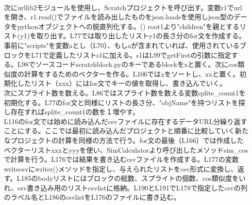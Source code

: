 \documentclass[a4paper,10pt,onecolumn,oneside,openany]{jsbook}
\begin{document}
\\
次にurllib2モジュールを使用し、Scratchプロジェクトを呼び出す。変数r1でurlを開き、r1.read()でファイルを読み出したものをjson.loadsを使用しjson型のデータをpythonオブジェクトへの脱直列化する。(\cite{loads})  root1より"children"を親とするリスト(y1)を取り出す。L77では取り出したリストy1の長さ分のfor文を作成する。事前に"scripts"を変数aとし（L70）、もしaが含まれていれば、使用されているブロックをL71で定義したリストs1に加える。s1はL99でgetFirstの引数に指定する。L98でソースコードscratchblock.pyのキーであるblockをxと置く。次にcos類似度の計算をするためのベクターを作る。L106ではxをソートし、xxと置く。初期化したリスト（xxx）にはfor文でキーの値を取得し、書き込んでいく。
\\
次にスプライト数を数える。L86ではスプライト数を数える変数splite\_count1を初期化する。L77のfor文と同様にリストの長さ分、"objName"を持つリストを探し存在すればsplite\_count1の数を１増やす。
\\
L116のfor文では始めに読み込んだcsvファイルに存在するデータURL分繰り返すことにする。ここでは最初に読み込んだプロジェクトと順番に比較していく新たなプロジェクトの計算を同様の方法で行う。for文の最後（L166）では作成したベクターリストxxxとyyyを使い、SimCalculatorより呼び出したメソッドsim\_cosで計算を行う。L176では結果を書き込むcsvファイルを作成する。L177の変数writecsvにwriter()メソッドを指定し、与えられたリストをcsv形式に変換し、返す。L185のbodyリストにはブロックの総数、スプライトの個数、cos類似度をいれ、csv書き込み用のリストcsvlistに格納。L190とL191でL178で指定したcsvの列のラベル名とL186のcsvlistをL176のファイルに書き込む。
\end{document}
